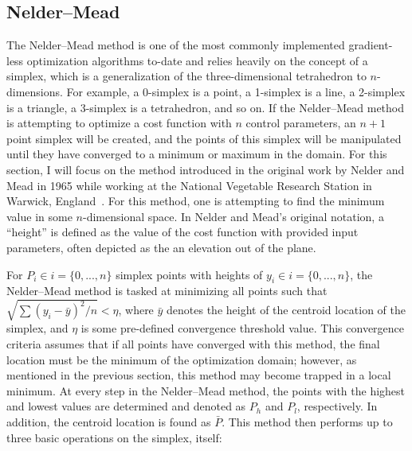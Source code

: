 \subsection{Nelder--Mead}
\label{sec:NM}

The Nelder--Mead method is one of the most commonly implemented gradient-less optimization algorithms to-date and relies heavily on the concept of a simplex, which is a generalization of the three-dimensional tetrahedron to $n$-dimensions.
For example, a 0-simplex is a point, a 1-simplex is a line, a 2-simplex is a triangle, a 3-simplex is a tetrahedron, and so on.
If the Nelder--Mead method is attempting to optimize a cost function with $n$ control parameters, an $n+1$ point simplex will be created, and the points of this simplex will be manipulated until they have converged to a minimum or maximum in the domain.
For this section, I will focus on the method introduced in the original work by Nelder and Mead in 1965 while working at the National Vegetable Research Station in Warwick, England~\cite{nelder1965}.
For this method, one is attempting to find the minimum value in some $n$-dimensional space.
In Nelder and Mead's original notation, a ``height'' is defined as the value of the cost function with provided input parameters, often depicted as the an elevation out of the plane.

For $P_i \in i=\{0,...,n\}$ simplex points with heights of $y_i \in i=\{0,...,n\}$, the Nelder--Mead method is tasked at minimizing all points such that $\sqrt{\sum(y_i-\bar y)^2/n} < \eta$, where $\bar y$ denotes the height of the centroid location of the simplex, and $\eta$ is some pre-defined convergence threshold value.
This convergence criteria assumes that if all points have converged with this method, the final location must be the minimum of the optimization domain; however, as mentioned in the previous section, this method may become trapped in a local minimum.
At every step in the Nelder--Mead method, the points with the highest and lowest values are determined and denoted as $P_h$ and $P_l$, respectively.
In addition, the centroid location is found as $\bar P$.
This method then performs up to three basic operations on the simplex, itself:

